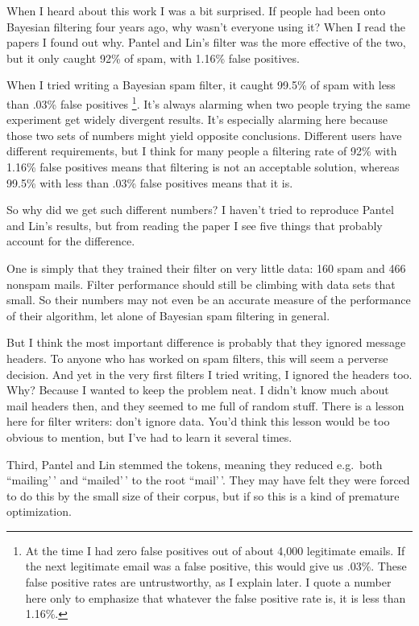 When I heard about this work I was a bit surprised. If people had been
onto Bayesian filtering four years ago, why wasn't everyone using it?
When I read the papers I found out why. Pantel and Lin's filter was the
more effective of the two, but it only caught 92\% of spam, with 1.16\%
false positives.

When I tried writing a Bayesian spam filter, it caught 99.5\% of spam
with less than .03\% false positives \footnote{At the time I had zero false positives out of about 4,000
legitimate emails. If the next legitimate email was a false positive,
this would give us .03\%. These false positive rates are untrustworthy,
as I explain later. I quote a number here only to emphasize that
whatever the false positive rate is, it is less than 1.16\%.}. It's always alarming when
two people trying the same experiment get widely divergent results. It's
especially alarming here because those two sets of numbers might yield
opposite conclusions. Different users have different requirements, but I
think for many people a filtering rate of 92\% with 1.16\% false
positives means that filtering is not an acceptable solution, whereas
99.5\% with less than .03\% false positives means that it is.

So why did we get such different numbers? I haven't tried to reproduce
Pantel and Lin's results, but from reading the paper I see five things
that probably account for the difference.

One is simply that they trained their filter on very little data: 160
spam and 466 nonspam mails. Filter performance should still be climbing
with data sets that small. So their numbers may not even be an accurate
measure of the performance of their algorithm, let alone of Bayesian
spam filtering in general.

But I think the most important difference is probably that they ignored
message headers. To anyone who has worked on spam filters, this will
seem a perverse decision. And yet in the very first filters I tried
writing, I ignored the headers too. Why? Because I wanted to keep the
problem neat. I didn't know much about mail headers then, and they
seemed to me full of random stuff. There is a lesson here for filter
writers: don't ignore data. You'd think this lesson would be too obvious
to mention, but I've had to learn it several times.

Third, Pantel and Lin stemmed the tokens, meaning they reduced e.g.~both
``mailing'\,' and ``mailed'\,' to the root ``mail'\,'. They may have
felt they were forced to do this by the small size of their corpus, but
if so this is a kind of premature optimization.

